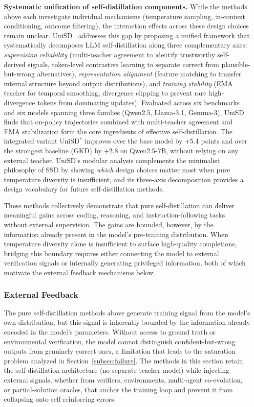 \documentclass{article} %
\begin{document}
\textbf{Systematic unification of self-distillation components.} While the methods above each investigate individual mechanisms (temperature sampling, in-context conditioning, outcome filtering), the interaction effects across these design choices remain unclear. UniSD~\citep{jin2026unisd} addresses this gap by proposing a unified framework that systematically decomposes LLM self-distillation along three complementary axes: \emph{supervision reliability} (multi-teacher agreement to identify trustworthy self-derived signals, token-level contrastive learning to separate correct from plausible-but-wrong alternatives), \emph{representation alignment} (feature matching to transfer internal structure beyond output distributions), and \emph{training stability} (EMA teacher for temporal smoothing, divergence clipping to prevent rare high-divergence tokens from dominating updates). Evaluated across six benchmarks and six models spanning three families (Qwen2.5, Llama-3.1, Gemma-3), UniSD finds that on-policy trajectories combined with multi-teacher agreement and EMA stabilization form the core ingredients of effective self-distillation. The integrated variant UniSD$^*$ improves over the base model by +5.4 points and over the strongest baseline (GKD) by +2.8 on Qwen2.5-7B, without relying on any external teacher. UniSD's modular analysis complements the minimalist philosophy of SSD by showing \emph{which} design choices matter most when pure temperature diversity is insufficient, and its three-axis decomposition provides a design vocabulary for future self-distillation methods.

These methods collectively demonstrate that pure self-distillation can deliver meaningful gains across coding, reasoning, and instruction-following tasks without external supervision. The gains are bounded, however, by the information already present in the model's pre-training distribution. When temperature diversity alone is insufficient to surface high-quality completions, bridging this boundary requires either connecting the model to external verification signals or internally generating privileged information, both of which motivate the external feedback mechanisms below.

\subsubsection{External Feedback}
\label{subsec:external_feedback}

The pure self-distillation methods above generate training signal from the model's own distribution, but this signal is inherently bounded by the information already encoded in the model's parameters. Without access to ground truth or environmental verification, the model cannot distinguish confident-but-wrong outputs from genuinely correct ones, a limitation that leads to the saturation problem analyzed in Section~\ref{subsec:failure}. The methods in this section retain the self-distillation architecture (no separate teacher model) while injecting external signals, whether from verifiers, environments, multi-agent co-evolution, or partial-solution oracles, that anchor the training loop and prevent it from collapsing onto self-reinforcing errors.
\end{document}
